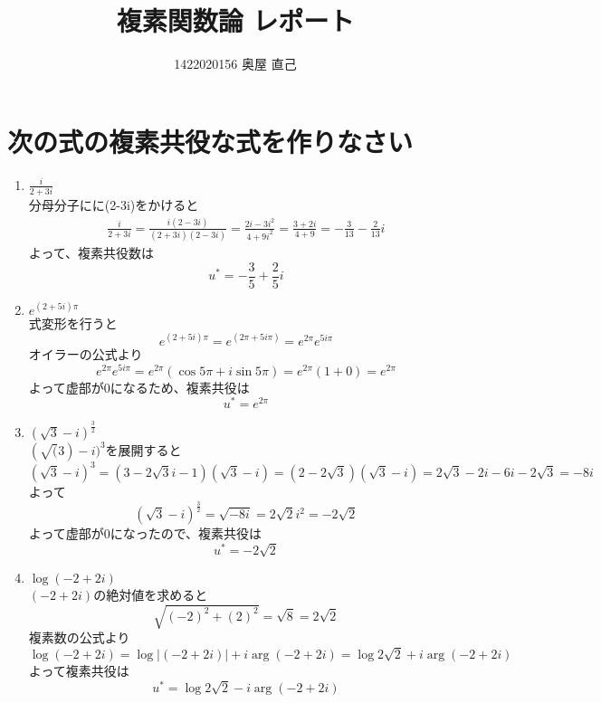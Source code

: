 \documentclass{jsarticle}
\title{複素関数論 レポート}
\author{1422020156 奥屋 直己}
\begin{document}
\maketitle

\section{次の式の複素共役な式を作りなさい}
	\begin{enumerate}[(1)]
		\item $\frac{i}{2+3i}$\\
			分母分子にに(2-3i)をかけると\\
			\begin{eqnarray*}
				\frac{i}{2+3i}=\frac{i(2-3i)}{(2+3i)(2-3i)}=\frac{2i-3i^2}{4+9i^2}=\frac{3+2i}{4+9}=-\frac{3}{13}-\frac{2}{13}i
			\end{eqnarray*}
			よって、複素共役数は
			\[
				u^*=-\frac{3}{5}+\frac{2}{5}i
			\]
		\item $e^{(2+5i)π}$ \\
			式変形を行うと
			\[
				e^{(2+5i)\pi}=e^{(2\pi+5i\pi)}=e^{2\pi}e^{5i\pi}
			\]
			オイラーの公式より
			\[
				e^{2\pi}e^{5i\pi}=e^{2\pi}(\cos5\pi+i\sin5\pi)=e^{2\pi}(1+0)=e^{2\pi}
			\]
			よって虚部が0になるため、複素共役は
			\[
				u^*=e^{2\pi}
			\]
		\item $(\sqrt{3}-i)^\frac{3}{2}$\\
			$(\sqrt(3)-i)^3$を展開すると
			\[
				(\sqrt{3}-i)^3=(3-2\sqrt{3}i-1)(\sqrt{3}-i)=(2-2\sqrt{3})(\sqrt{3}-i)=2\sqrt{3}-2i-6i-2\sqrt{3}=-8i
			\]
			よって
			\[
				(\sqrt{3}-i)^\frac{3}{2}=\sqrt{-8i}=2\sqrt{2}i^2=-2\sqrt{2}
			\]
			よって虚部が0になったので、複素共役は
			\[
				u^*=-2\sqrt{2}
			\]
			
		\item $\log{(-2+2i)}$ \\
                  $(-2+2i)$の絶対値を求めると
                  \[
                      \sqrt{(-2)^2+(2)^2}=\sqrt{8}=2\sqrt{2}
                  \]
                  複素数の公式より
                  \[
                      \log{(-2+2i)}=\log{|(-2+2i)|}+i\arg{(-2+2i)}=\log{2\sqrt{2}}+i\arg{(-2+2i)}
                  \]
                  よって複素共役は
                  \[
                  u^*=\log{2\sqrt{2}}-i\arg{(-2+2i)}
                  \]
\end{enumerate}
\end{document}

